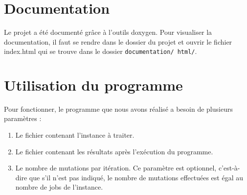 	\paragraph{}

	\section{Documentation}
	
	\paragraph{}
	Le projet a été documenté grâce à l'outils doxygen. Pour visualiser la documentation, il faut se rendre dans le dossier du projet et ouvrir le fichier index.html qui se trouve dans le dossier \texttt{documentation/ html/}.

	\section{Utilisation du programme}
	
	\paragraph{}
	Pour fonctionner, le programme que nous avons réalisé a besoin de plusieurs paramètres :
	\begin{enumerate}
		\item Le fichier contenant l'instance à traiter.
		\item Le fichier contenant les résultats après l'exécution du programme.
		\item Le nombre de mutations par itération. Ce paramètre est optionnel, c'est-à-dire que s'il n'est pas indiqué, le nombre de mutations effectuées est égal au nombre de jobs de l'instance.
	\end{enumerate}	
%